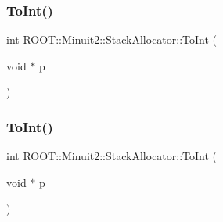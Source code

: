 \subsubsection{\texorpdfstring{ToInt()}{ToInt()}\hspace{0.1cm}{\footnotesize\ttfamily [1/2]}}
{\footnotesize\ttfamily int R\+O\+O\+T\+::\+Minuit2\+::\+Stack\+Allocator\+::\+To\+Int (\begin{DoxyParamCaption}\item[{void $\ast$}]{p }\end{DoxyParamCaption})\hspace{0.3cm}{\ttfamily [inline]}}

\mbox{\label{classROOT_1_1Minuit2_1_1StackAllocator_a8c8afb9902a08eec0ec7c863636694e5}} 
\subsubsection{\texorpdfstring{ToInt()}{ToInt()}\hspace{0.1cm}{\footnotesize\ttfamily [2/2]}}
{\footnotesize\ttfamily int R\+O\+O\+T\+::\+Minuit2\+::\+Stack\+Allocator\+::\+To\+Int (\begin{DoxyParamCaption}\item[{void $\ast$}]{p }\end{DoxyParamCaption})\hspace{0.3cm}{\ttfamily [inline]}}


